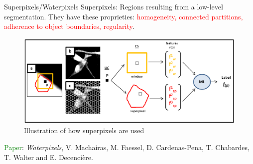 \documentclass{beamer}
\begin{document}
\begin{frame}{Superpixels/Waterpixels}
Superpixels: Regions resulting from a low-level segmentation. 
They have these proprieties: \textcolor{red}{homogeneity, connected partitions, adherence to object boundaries, regularity}.
\begin{figure}[!ht]
\centering
\includegraphics[width=\textwidth]{Waterpixels.png}
\caption{Illustration of how superpixels are used}
\label{}
\end{figure}
\begin{small}
\textcolor{green}{Paper}: \textit{Waterpixels}, V. Machairas, M. Faessel, D. Cardenas-Pena, T. Chabardes, T. Walter and E. Decencière.
\end{small}
\end{frame}
\end{document}
